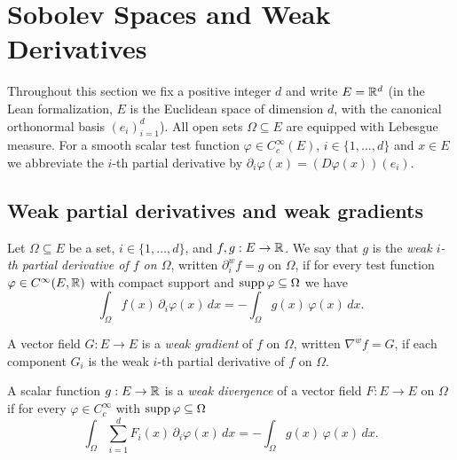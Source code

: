 \chapter{Sobolev Spaces and Weak Derivatives}\label{sec:sobolev}


Throughout this section we fix a positive integer $d$ and write $E = \mathbb{R}^d$ (in
the Lean formalization, $E$ is the Euclidean space of dimension $d$, with the
canonical orthonormal basis $(e_i)_{i=1}^d$). All open sets $\Omega \subseteq E$
are equipped with Lebesgue measure. For a smooth scalar test function $\varphi
\in C_c^\infty(E)$, $i \in \{1,\ldots,d\}$ and $x \in E$ we abbreviate the
$i$-th partial derivative by $\partial_i \varphi(x) = (D\varphi(x))(e_i)$.

\section{Weak partial derivatives and weak gradients}

\begin{definition}
\label{def:HasWeakPartialDeriv}
\leanok
Let $\Omega \subseteq E$ be a set, $i \in \{1,\ldots,d\}$, and $f, g : E \to \mathbb{R}$.
We say that $g$ is the \emph{weak $i$-th partial derivative of $f$ on $\Omega$},
written $\partial_i^w f = g$ on $\Omega$, if for every test function
$\varphi \in C^\infty(E,\mathbb{R})$ with compact support and $\operatorname{supp} \varphi \subseteq
\Omega$ we have
\begin{equation*}
  \int_\Omega f(x) \, \partial_i \varphi(x) \, dx
    = - \int_\Omega g(x) \, \varphi(x) \, dx.
\end{equation*}
\end{definition}

\begin{definition}
\label{def:HasWeakGrad}
\leanok
{}
A vector field $G : E \to E$ is a \emph{weak gradient} of $f$ on $\Omega$,
written $\nabla^w f = G$, if each component $G_i$ is the weak $i$-th partial
derivative of $f$ on $\Omega$.

A scalar function $g : E \to \mathbb{R}$ is a \emph{weak divergence} of a vector field
$F : E \to E$ on $\Omega$ if for every $\varphi \in C_c^\infty$ with $\operatorname{supp}
\varphi \subseteq \Omega$
\begin{equation*}
  \int_\Omega \sum_{i=1}^d F_i(x) \, \partial_i \varphi(x) \, dx
    = - \int_\Omega g(x)\, \varphi(x)\, dx.
\end{equation*}
\end{definition}

